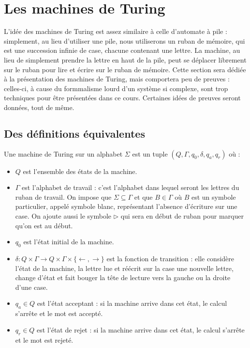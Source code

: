 \section{Les machines de Turing}

L'idée des machines de Turing est assez similaire à celle d'automate à pile : simplement, au lieu d'utiliser une pile, nous utiliserons un ruban de mémoire, qui est une succession infinie de case, chacune contenant une lettre. La machine, au lieu de simplement prendre la lettre en haut de la pile, peut se déplacer librement sur le ruban pour lire et écrire sur le ruban de mémoire. Cette section sera dédiée à la présentation des machines de Turing, mais comportera peu de preuves : celles-ci, à cause du formmalisme lourd d'un système si complexe, sont trop techniques pour être présentées dans ce cours. Certaines idées de preuves seront données, tout de même.

\subsection{Des définitions équivalentes}

\begin{defi}
    Une machine de Turing sur un alphabet $\Sigma$ est un tuple $(Q,\Gamma,q_0,\delta,q_a,q_r)$ où :
    \begin{itemize}[label=$\bullet$]
        \item $Q$ est l'ensemble des états de la machine.
        \item $\Gamma$ est l'alphabet de travail : c'est l'alphabet dans lequel seront les lettres du ruban de travail. On impose que $\Sigma\subseteq \Gamma$ et que $B\in\Gamma$ où $B$ est un symbole particulier, appelé symbole blanc, représentant l'absence d'écriture sur une case. On ajoute aussi le symbole $\rhd$ qui sera en début de ruban pour marquer qu'on est au début.
        \item $q_0$ est l'état initial de la machine.
        \item $\delta : Q\times \Gamma\to Q\times \Gamma \times \{\leftarrow,\rightarrow\}$ est la fonction de transition : elle considère l'état de la machine, la lettre lue et réécrit sur la case une nouvelle lettre, change d'état et fait bouger la tête de lecture vers la gauche ou la droite d'une case.
        \item $q_a\in Q$ est l'état acceptant : si la machine arrive dans cet état, le calcul s'arrête et le mot est accepté.
        \item $q_r\in Q$ est l'état de rejet : si la machine arrive dans cet état, le calcul s'arrête et le mot est rejeté.
    \end{itemize}
\end{defi}

